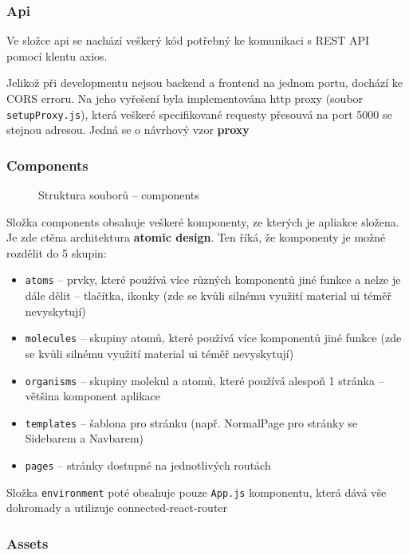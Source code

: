 \documentclass[a4paper,oneside,12pt]{report}
\begin{document}
\subsubsection{Api}
Ve složce api se nachází veškerý kód potřebný ke komunikaci s REST API pomocí klentu axios.

Jelikož při developmentu nejsou backend a frontend na jednom portu, dochází ke CORS erroru. Na jeho vyřešení byla implementována http proxy (soubor \texttt{setupProxy.js}), která veškeré specifikované requesty přesouvá na port 5000 se stejnou adresou. Jedná se o návrhový vzor \textbf{proxy}

\subsubsection{Components}

\begin{figure}[H]
   \caption[Struktura souborů -- components]{Struktura souborů -- components}
   \label{fig:frontendStructureComponentes}
\end{figure}
Složka components obsahuje veškeré komponenty, ze kterých je apliakce složena. Je zde ctěna architektura \textbf{atomic design}. Ten říká, že komponenty je možné rozdělit do 5 skupin:
\begin{itemize}
   \item \texttt{atoms} -- prvky, které používá více různých komponentů jiné funkce a nelze je dále dělit -- tlačítka, ikonky (zde se kvůli silnému využití material ui téměř nevyskytují)
   \item \texttt{molecules} -- skupiny atomů, které používá více komponentů jiné funkce (zde se kvůli silnému využití material ui téměř nevyskytují)
   \item \texttt{organisms} -- skupiny molekul a atomů, které používá alespoň 1 stránka -- většina komponent aplikace
   \item \texttt{templates} -- šablona pro stránku (např. NormalPage pro stránky se Sidebarem a Navbarem)
   \item \texttt{pages} -- stránky dostupné na jednotlivých routách
\end{itemize}
Složka \texttt{environment} poté obsahuje pouze \texttt{App.js} komponentu, která dává vše dohromady a utilizuje connected-react-router

\subsubsection{Assets}
\end{document}
